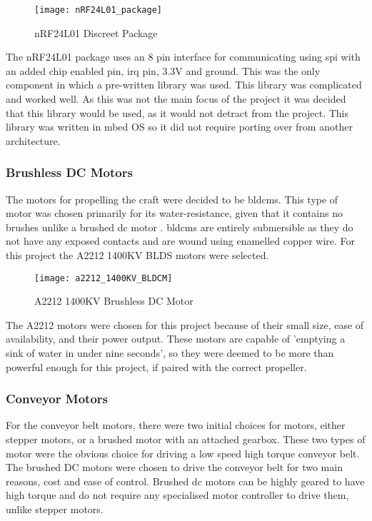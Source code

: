 \documentclass [12pt]{article}
\begin{document}
\begin{figure}[H]
\centerline{\texttt{[image: nRF24L01\_package]}}
\caption{nRF24L01 Discreet Package}
\label{fig:nRF24L01_package}
\end{figure}

The nRF24L01 package uses an 8 pin interface for communicating using \gls{spi} with an added chip enabled pin, \gls{irq} pin, 3.3V and ground. This was the only component in which a pre-written library was used. This library was complicated and worked well. As this was not the main focus of the project it was decided that this library would be used, as it would not detract from the project. This library was written in \gls{mbed} OS so it did not require porting over from another architecture.  

\subsubsection{Brushless DC Motors}

The motors for propelling the craft were decided to be \gls{bldcm}s. This type of motor was chosen primarily for its water-resistance, given that it contains no brushes unlike a brushed \gls{dc} motor \cite{brushed_vs_brushless}. \gls{bldcm}s are entirely submersible as they do not have any exposed contacts and are wound using enamelled copper wire. For this project the A2212 1400KV BLDS motors were selected. 

\begin{figure}[H]
\centerline{\texttt{[image: a2212\_1400KV\_BLDCM]}}
\caption{A2212 1400KV Brushless DC Motor}
\label{fig:a2212_1400KV_BLDCM}
\end{figure}

The A2212 motors were chosen for this project because of their small size, ease of availability, and their power output. These motors are capable of 'emptying a sink of water in under nine seconds', so they were deemed to be more than powerful enough for this project, if paired with the correct propeller. 

\subsubsection{Conveyor Motors}

For the conveyor belt motors, there were two initial choices for motors, either stepper motors, or a brushed motor with an attached gearbox. These two types of motor were the obvious choice for driving a low speed high torque conveyor belt. The brushed DC motors were chosen to drive the conveyor belt for two main reasons, cost and ease of control. Brushed \gls{dc} motors can be highly geared to have high torque and do not require any specialised motor controller to drive them, unlike stepper motors.
\end{document}
